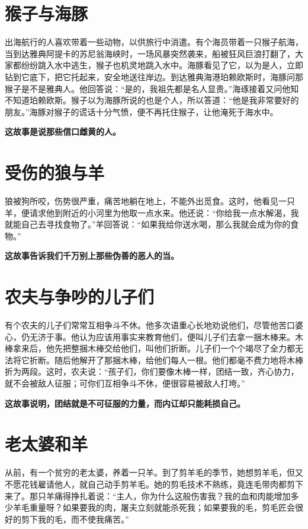 \section{猴子与海豚}

出海航行的人喜欢带着一些动物，以供旅行中消遣。有个海员带着一只猴子航海，当到达雅典阿提卡的苏尼翁海峡时，一场风暴突然袭来，船被狂风巨浪打翻了，大家都纷纷跳入水中逃生，猴子也机灵地跳入水中。海豚看见了它，以为是人，立即钻到它底下，把它托起来，安全地送往岸边。到达雅典海港珀赖欧斯时，海豚问那猴子是不是雅典人。他回答说：“是的，我祖先都是名人显贵。”海琢接着又问他知不知道珀赖欧斯。猴子以为海豚所说的也是个人，所以答道：“他是我非常要好的朋友。”海豚对猴子的谎话十分气愤，便不再托住猴子，让他淹死于海水中。

{\bfseries \color{red}这故事是说那些信口雌黄的人。}

\section{受伤的狼与羊}

狼被狗所咬，伤势很严重，痛苦地躺在地上，不能外出觅食。这时，他看见一只羊，便请求他到附近的小河里为他取一点水来。他还说：“你给我一点水解渴，我就能自己去寻找食物了。”羊回答说：“如果我给你送水喝，那么我就会成为你的食物。”

{\bfseries \color{red}这故事告诉我们千万别上那些伪善的恶人的当。}

\section{农夫与争吵的儿子们}

有个农夫的儿子们常常互相争斗不休。他多次语重心长地劝说他们，尽管他苦口婆心，仍无济于事。他认为应该用事实来教育他们，便叫儿子们去拿一捆木棒来。木棒拿来后，他先把整捆木棒交给他们，叫他们折断。儿子们一个个竭尽了全力都无法将它折断。随后他解开了那捆木棒，给他们每人一根。他们都毫不费力地将木棒折为两段。这时，农夫说：“孩子们，你们要像木棒一样，团结一致，齐心协力，就不会被敌人征服；可你们互相争斗不休，便很容易被敌人打垮。”

{\bfseries \color{red}这故事说明，团结就是不可征服的力量，而内讧却只能耗损自己。}

\section{老太婆和羊}

从前，有一个贫穷的老太婆，养着一只羊。到了剪羊毛的季节，她想剪羊毛，但又不愿花钱雇请他人，就自己动手剪羊毛。她的剪毛技术不熟练，竟连毛带肉都剪下来了。那只羊痛得挣扎着说：“主人，你为什么这般伤害我？我的血和肉能增加多少羊毛重量呀？如果要我的肉，屠夫立刻就能杀死我；如果要我的毛，剪毛匠会很好的剪下我的毛，而不使我痛苦。”

